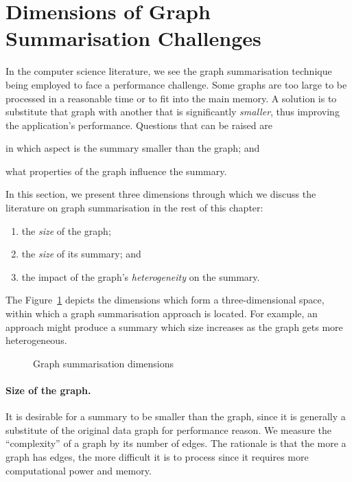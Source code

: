 \section{Dimensions of Graph Summarisation Challenges}

In the computer science literature, we see the graph summarisation technique being employed to face a performance challenge. Some graphs are too large to be processed in a reasonable time or to fit into the main memory. A solution is to substitute that graph with another that is significantly \emph{smaller}, thus improving the application's performance. Questions that can be raised are
\begin{inparaenum}[(a)]
\item in which aspect is the summary smaller than the graph; and
\item what properties of the graph influence the summary.
\end{inparaenum}
In this section, we present three dimensions through which we discuss the literature on graph summarisation in the rest of this chapter:
\begin{enumerate}
\item the \emph{size} of the graph;
\item the \emph{size} of its summary; and
\item the impact of the graph's \emph{heterogeneity} on the summary.
\end{enumerate}
The Figure~\ref{fig:gs-axis} depicts the dimensions which form a three-dimensional space, within which a graph summarisation approach is located. For example, an approach might produce a summary which size increases as the graph gets more heterogeneous.

\begin{figure}
	\centering
	\resizebox{.5\textwidth}{!}{
		
	}
	\caption{Graph summarisation dimensions}
	\label{fig:gs-axis}
\end{figure}

\paragraph{Size of the graph.}

It is desirable for a summary to be smaller than the graph, since it is generally a substitute of the original data graph for performance reason. We measure the ``complexity'' of a graph by its number of edges. The rationale is that the more a graph has edges, the more difficult it is to process since it requires more computational power and memory.
%

